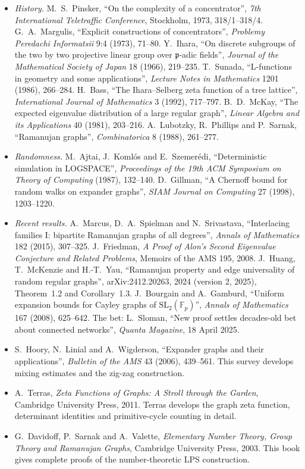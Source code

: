 \begin{itemize}
\item \emph{History.} M.~S.~Pinsker, ``On the complexity of a concentrator'', \emph{7th International Teletraffic Conference}, Stockholm, 1973, 318/1--318/4. G.~A.~Margulis, ``Explicit constructions of concentrators'', \emph{Problemy
Peredachi Informatsii} 9:4 (1973), 71--80. Y.~Ihara, ``On discrete subgroups of the two by two projective linear group over $\mathfrak p$-adic fields'', \emph{Journal of the Mathematical Society of Japan} 18 (1966), 219--235.
T.~Sunada, ``L-functions in geometry and some applications'', \emph{Lecture Notes in Mathematics} 1201 (1986), 266--284. H.~Bass, ``The Ihara--Selberg zeta function of a tree lattice'', \emph{International Journal of Mathematics} 3
(1992), 717--797. B.~D.~McKay, ``The expected eigenvalue distribution of a large regular graph'', \emph{Linear Algebra and its Applications} 40 (1981), 203--216. A.~Lubotzky, R.~Phillips and P.~Sarnak, ``Ramanujan graphs'',
\emph{Combinatorica} 8 (1988), 261--277.
\item \emph{Randomness.} M.~Ajtai, J.~Koml\'os and E.~Szemer\'edi, ``Deterministic simulation in LOGSPACE'', \emph{Proceedings of the 19th ACM Symposium on Theory of Computing} (1987), 132--140. D.~Gillman, ``A Chernoff bound for
random walks on expander graphs'', \emph{SIAM Journal on Computing} 27 (1998), 1203--1220.
\item \emph{Recent results.} A.~Marcus, D.~A.~Spielman and N.~Srivastava, ``Interlacing families I: bipartite Ramanujan graphs of all degrees'', \emph{Annals of Mathematics} 182 (2015), 307--325. J.~Friedman, \emph{A Proof of Alon's
Second Eigenvalue Conjecture and Related Problems}, Memoirs of the AMS 195, 2008. J.~Huang, T.~McKenzie and H.-T.~Yau, ``Ramanujan property and edge universality of random regular graphs'', arXiv:2412.20263, 2024 (version 2, 2025), Theorem~1.2 and Corollary~1.3.
J.~Bourgain and A.~Gamburd, ``Uniform expansion bounds for Cayley graphs of $\mathrm{SL}_2(\mathbb F_p)$'', \emph{Annals of Mathematics} 167 (2008), 625--642. The bet: L.~Sloman, ``New proof settles decades-old bet
about connected networks'', \emph{Quanta Magazine}, 18 April 2025.
\item S.~Hoory, N.~Linial and A.~Wigderson, ``Expander graphs and their applications'', \emph{Bulletin of the AMS} 43 (2006), 439--561. This survey develops mixing estimates and the zig-zag construction.
\item A.~Terras, \emph{Zeta Functions of Graphs: A Stroll through the Garden}, Cambridge University Press, 2011. Terras develops the graph zeta function, determinant identities and primitive-cycle counting in detail.
\item G.~Davidoff, P.~Sarnak and A.~Valette, \emph{Elementary Number Theory, Group Theory and Ramanujan Graphs}, Cambridge University Press, 2003. This book gives complete proofs of the number-theoretic LPS construction.
\end{itemize}
